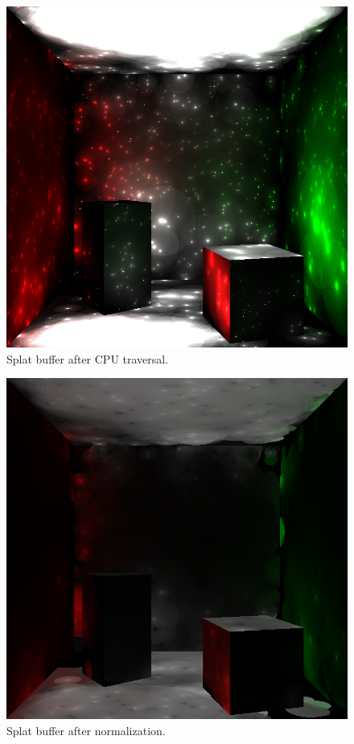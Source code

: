 \documentclass[10pt,twopage]{acmsiggraph}
\begin{document}
\begin{figure}[htbp]
\begin{center}
\includegraphics[scale = .3]{firstBounceLight.png}
\caption{Splat buffer after CPU traversal.}
\label{direct}
\end{center}
\end{figure}

\begin{figure}[htbp]
\begin{center}
\includegraphics[scale = .3]{indirectContribution.png}
\caption{Splat buffer after normalization.}
\label{direct}
\end{center}
\end{figure}
\end{document}
